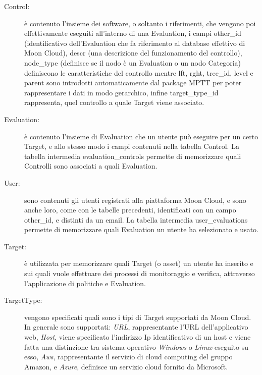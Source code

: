 \begin{description}
    \item[Control:] è contenuto l'insieme dei software, o soltanto i riferimenti, che vengono poi effettivamente eseguiti all'interno 
    di una Evaluation, i campi other\_id (identificativo dell'Evaluation che fa riferimento al database effettivo di Moon Cloud), 
    descr (una descrizione del funzionamento del controllo), node\_type (definisce se il nodo è un Evaluation o un nodo Categoria) 
    definiscono le caratteristiche del controllo mentre lft, rght, tree\_id, level e parent sono introdotti 
    automaticamente dal package MPTT per poter rappresentare i dati in modo gerarchico, infine target\_type\_id rappresenta, quel 
    controllo a quale Target viene associato.
    \item[Evaluation:] è contenuto l'insieme di Evaluation che un utente può eseguire per un certo Target, e allo stesso modo 
    i campi contenuti nella tabella Control. La tabella intermedia evaluation\_controls permette di memorizzare quali Controlli 
    sono associati a quali Evaluation.
    \item[User:] sono contenuti gli utenti registrati alla piattaforma Moon Cloud, e sono anche loro, come con le tabelle precedenti, 
    identificati con un campo other\_id, e distinti da un email. La tabella intermedia user\_evaluations permette di memorizzare 
    quali Evaluation un utente ha selezionato e usato.
    \item[Target:] è utilizzata per memorizzare quali Target (o asset) un utente ha inserito e sui quali vuole effettuare dei processi 
    di monitoraggio e verifica, attraverso l'applicazione di politiche e Evaluation.
    \item[TargetType:] vengono specificati quali sono i tipi di Target supportati da Moon Cloud. In generale sono supportati: \textit{URL}, 
    rappresentante l'URL dell'applicativo web, \textit{Host}, viene specificato l'indirizzo Ip identificativo di un host e viene fatta una 
    distinzione tra sistema operativo \textit{Windows} o \textit{Linux} eseguito su esso, \textit{Aws}, rappresentante il servizio di cloud computing del 
    gruppo Amazon, e \textit{Azure}, definisce un servizio cloud fornito da Microsoft.
\end{description}
